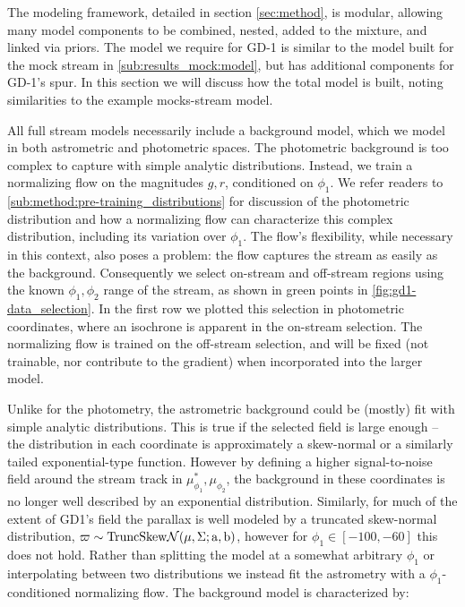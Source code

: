 \documentclass[twocolumn, linenumbers]{aastex631}
\newcommand{\stream}[1]{#1}
\newcommand{\mcal}[1]{\mathcal{#1}}
\newcommand{\parallax}{\varpi}
\begin{document}
        The modeling framework, detailed in section \autoref{sec:method}, is
        modular, allowing many model components to be combined, nested, added to
        the mixture, and linked via priors.  The model we require for
        \stream{GD-1} is similar to the model built for the mock stream in
        \autoref{sub:results_mock:model}, but has additional components for
        \stream{GD-1}'s spur.  In this section we will discuss how the total
        model is built, noting similarities to the example mocks-stream model.

        All full stream models necessarily include a background model, which we
        model in both astrometric and photometric spaces.  The photometric
        background is too complex to capture with simple analytic distributions.
        Instead, we train a normalizing flow on the magnitudes $g, r$,
        conditioned on $\phi_1$. We refer readers to
        \autoref{sub:method:pre-training_distributions} for discussion of the
        photometric distribution and how a normalizing flow can characterize
        this complex distribution, including its variation over $\phi_1$.  The
        flow's flexibility, while necessary in this context, also poses a
        problem: the flow captures the stream as easily as the background.
        Consequently we select on-stream and off-stream regions using the known
        $\phi_1,\phi_2$ range of the stream, as shown in green points in 
        \autoref{fig:gd1-data_selection}.  In the first row
        we plotted this selection in photometric coordinates, where an isochrone
        is apparent in the on-stream selection.  The normalizing flow is trained
        on the off-stream selection, and will be fixed (not trainable, nor
        contribute to the gradient) when incorporated into the larger model.

        Unlike for the photometry, the astrometric background could be (mostly)
        fit with simple analytic distributions.  This is true if the selected
        field is large enough -- the distribution in each coordinate is
        approximately a skew-normal or a similarly tailed exponential-type
        function. However by defining a higher signal-to-noise field around the
        \citet{Ibata+2021} stream track in $\mu_{\phi_1}^*, \mu_{\phi_2}$, the
        background in these coordinates is no longer well described by an
        exponential distribution. Similarly, for much of the extent of
        \stream{GD1's} field the parallax is well modeled by a truncated
        skew-normal distribution, $\parallax \sim \rm{TruncSkew}\mcal{N}(\mu,
        \Sigma; a, b)$, however for $\phi_1 \in [-100, -60]$ this does not hold.
        Rather than splitting the model at a somewhat arbitrary $\phi_1$ or
        interpolating between two distributions we instead fit the astrometry
        with a $\phi_1$-conditioned normalizing flow. The background model is
        characterized by:
\end{document}
